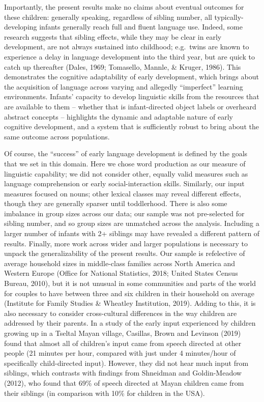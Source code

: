 \documentclass[
  english,
  man,floatsintext]{apa6}
\begin{document}
Importantly, the present results make no claims about eventual outcomes for these children: generally speaking, regardless of sibling number, all typically-developing infants generally reach full and fluent language use. Indeed, some research suggests that sibling effects, while they may be clear in early development, are not always sustained into childhood; e.g.~twins are known to experience a delay in language development into the third year, but are quick to catch up thereafter (Dales, 1969; Tomasello, Mannle, \& Kruger, 1986). This demonstrates the cognitive adaptability of early development, which brings about the acquisition of language across varying and allegedly \enquote{imperfect} learning environments. Infants' capacity to develop linguistic skills from the resources that are available to them -- whether that is infant-directed object labels or overheard abstract concepts -- highlights the dynamic and adaptable nature of early cognitive development, and a system that is sufficiently robust to bring about the same outcome across populations.

Of course, the \enquote{success} of early language development is defined by the goals that we set in this domain. Here we chose word production as our measure of linguistic capability; we did not consider other, equally valid measures such as language comprehension or early social-interaction skills. Similarly, our input measures focused on nouns; other lexical classes may reveal different effects, though they are generally sparser until toddlerhood. There is also some imbalance in group sizes across our data; our sample was not pre-selected for sibling number, and so group sizes are unmatched across the analysis. Including a larger number of infants with 2+ siblings may have revealed a different pattern of results. Finally, more work across wider and larger populations is necessary to unpack the generalizability of the present results. Our sample is refelective of average household sizes in middle-class families across North America and Western Europe (Office for National Statistics, 2018; United States Census Bureau, 2010), but it is not unusual in some communities and parts of the world for couples to have between three and six children in their household on average (Institute for Family Studies \& Wheatley Institution, 2019). Adding to this, it is also necessary to consider cross-cultural differences in the way children are addressed by their parents. In a study of the early input experienced by children growing up in a Tseltal Mayan village, Casillas, Brown and Levinson (2019) found that almost all of children's input came from speech directed at other people (21 minutes per hour, compared with just under 4 minutes/hour of specifically child-directed input). However, they did not hear much input from siblings, which contrasts with findings from Shneidman and Goldin-Meadow (2012), who found that 69\% of speech directed at Mayan children came from their siblings (in comparison with 10\% for children in the USA).
\end{document}
